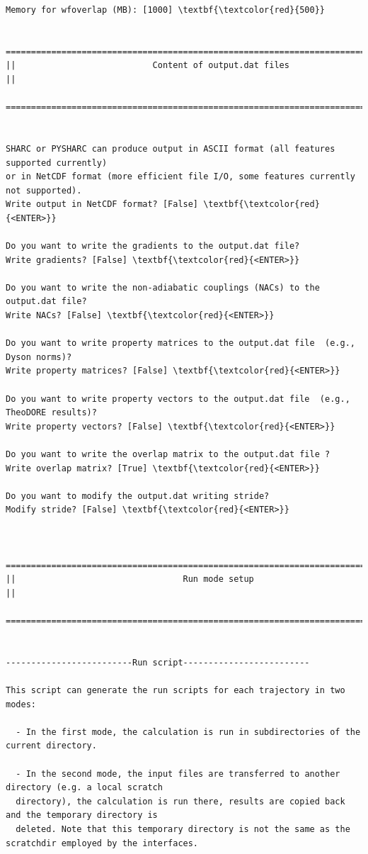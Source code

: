 \documentclass[a4paper,11pt,DIV=15,openany]{scrbook}
\begin{document}
\begin{oframed}
\begin{Verbatim}[commandchars=\\\{\}]
Memory for wfoverlap (MB): [1000] \textbf{\textcolor{red}{500}}

  ================================================================================
||                           Content of output.dat files                          ||
  ================================================================================


SHARC or PYSHARC can produce output in ASCII format (all features supported currently)
or in NetCDF format (more efficient file I/O, some features currently not supported).
Write output in NetCDF format? [False] \textbf{\textcolor{red}{<ENTER>}}

Do you want to write the gradients to the output.dat file?
Write gradients? [False] \textbf{\textcolor{red}{<ENTER>}}

Do you want to write the non-adiabatic couplings (NACs) to the output.dat file?
Write NACs? [False] \textbf{\textcolor{red}{<ENTER>}}

Do you want to write property matrices to the output.dat file  (e.g., Dyson norms)?
Write property matrices? [False] \textbf{\textcolor{red}{<ENTER>}}

Do you want to write property vectors to the output.dat file  (e.g., TheoDORE results)?
Write property vectors? [False] \textbf{\textcolor{red}{<ENTER>}}

Do you want to write the overlap matrix to the output.dat file ?
Write overlap matrix? [True] \textbf{\textcolor{red}{<ENTER>}}

Do you want to modify the output.dat writing stride?
Modify stride? [False] \textbf{\textcolor{red}{<ENTER>}}


  ================================================================================
||                                 Run mode setup                                 ||
  ================================================================================


-------------------------Run script-------------------------

This script can generate the run scripts for each trajectory in two modes:

  - In the first mode, the calculation is run in subdirectories of the current directory.

  - In the second mode, the input files are transferred to another directory (e.g. a local scratch 
  directory), the calculation is run there, results are copied back and the temporary directory is 
  deleted. Note that this temporary directory is not the same as the scratchdir employed by the interfaces.


\end{Verbatim}
\end{oframed}
\end{document}
